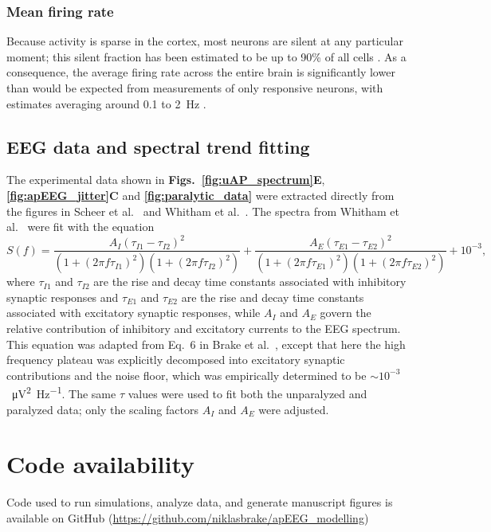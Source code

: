 \subsubsection{Mean firing rate}
Because activity is sparse in the cortex, most neurons are silent at any particular moment; this silent fraction has been estimated to be up to 90\% of all cells \cite{Shoham2006}. As a consequence, the average firing rate across the entire brain is significantly lower than would be expected from measurements of only responsive neurons, with estimates averaging around 0.1 to 2~\unit{\hertz} \cite{Kerr2005, Shoham2006, Barth2012}.

\subsection{EEG data and spectral trend fitting}
The experimental data shown in \textbf{Figs.~\ref{fig:uAP_spectrum}E}, \textbf{\ref{fig:apEEG_jitter}C} and \textbf{\ref{fig:paralytic_data}} were extracted directly from the figures in Scheer et al.~\cite{Scheer2006} and Whitham et al.~\cite{Whitham2007}. The spectra from Whitham et al.~\cite{Whitham2007} were fit with the equation
\begin{equation} \label{eq:syn_timescales}
S(f) = \frac{A_I(\tau_{I1}-\tau_{I2})^2}{(1+(2\pi f\tau_{I1})^2)(1+(2\pi f\tau_{I2})^2)}+\frac{A_E(\tau_{E1}-\tau_{E2})^2}{(1+(2\pi f\tau_{E1})^2)(1+(2\pi f\tau_{E2})^2)}+10^{-3},
\end{equation}
where $\tau_{I1}$ and $\tau_{I2}$ are the rise and decay time constants associated with inhibitory synaptic responses and $\tau_{E1}$ and $\tau_{E2}$ are the rise and decay time constants associated with excitatory synaptic responses, while $A_I$ and $A_E$ govern the relative contribution of inhibitory and excitatory currents to the EEG spectrum. This equation was adapted from Eq.~6 in Brake et al.~\cite{Brake2024}, except that here the high frequency plateau was explicitly decomposed into excitatory synaptic contributions and the noise floor, which was empirically determined to be ${\sim}10^{-3}$~\unit{{\micro\volt^2\hertz^{-1}}}. The same $\tau$ values were used to fit both the unparalyzed and paralyzed data; only the scaling factors $A_I$ and $A_E$ were adjusted. 

\section{Code availability}
Code used to run simulations, analyze data, and generate manuscript figures is available on GitHub (\url{https://github.com/niklasbrake/apEEG_modelling})

